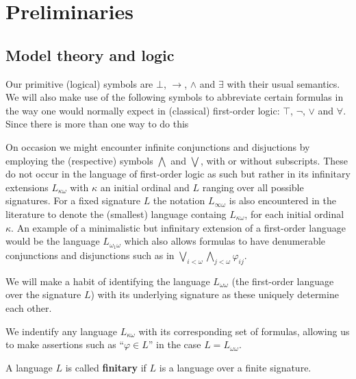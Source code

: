 
\chapter{Preliminaries}


\section{Model theory and logic}

Our primitive (logical) symbols are $\bot$, $\rightarrow$, $\wedge$ and $\exists$ with their usual semantics.  We will also make use of the following symbols to abbreviate certain formulas in the way one would normally expect in (classical) first-order logic: $\top$, $\neg$, $\vee$ and $\forall$.  Since there is more than one way to do this

On occasion we might encounter infinite conjunctions and disjuctions by employing the (respective) symbols $\bigwedge$ and $\bigvee$, with or without subscripts.  These do not occur in the language of first-order logic as such but rather in its infinitary extensions $L_{\kappa\omega}$ with $\kappa$ an initial ordinal and $L$ ranging over all possible signatures.  For a fixed signature $L$ the notation $L_{\infty\omega}$ is also encountered in the literature to denote the (smallest) language containg $L_{\kappa\omega}$, for each initial ordinal $\kappa$.  An example of a minimalistic but infinitary extension of a first-order language would be the language $L_{\omega_1\omega}$ which also allows formulas to have denumerable conjunctions and disjunctions such as in $\bigvee_{i<\omega}\bigwedge_{j<\omega}\varphi_{ij}$.

\begin{conv}
	We will make a habit of identifying the language $L_{\omega\omega}$ (the first-order language over the signature $L$) with its underlying signature as these uniquely determine each other.
\end{conv}

\begin{conv}
	We indentify any language $L_{\kappa\omega}$ with its corresponding set of formulas, allowing us to make assertions such as ``$\varphi\in L$'' in the case $L=L_{\omega\omega}$.
\end{conv}

\begin{dfn}
	A language $L$ is called \textbf{finitary} if $L$ is a language over a finite signature.
\end{dfn}

